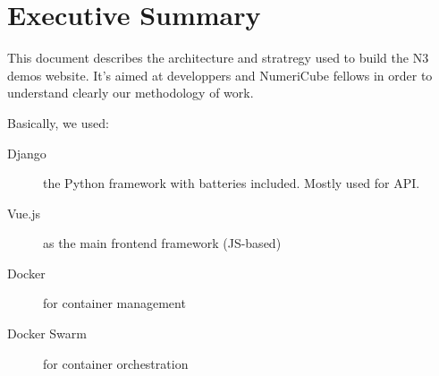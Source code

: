 
\chapter*{Executive Summary}
This document describes the architecture and stratregy used to build the N3 demos website.
It's aimed at developpers and NumeriCube fellows in order to understand clearly our methodology of work.

Basically, we used:
\begin{description}
\item[Django] the Python framework with batteries included. Mostly used for API.
\item[Vue.js] as the main frontend framework (JS-based)
\item[Docker] for container management
\item[Docker Swarm] for container orchestration
\end{description}

\cleardoublepage %
